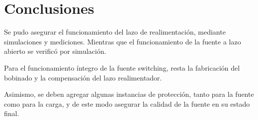 \documentclass[]{article}
\begin{document}
	\section{Conclusiones}
	
	Se pudo asegurar el funcionamiento del lazo de realimentación, mediante simulaciones y mediciones. Mientras que el funcionamiento de la fuente a lazo abierto se verificó por simulación.
	
	Para el funcionamiento íntegro de la fuente switching, resta la fabricación del bobinado y la compensación del lazo realimentador.
	
	Asimismo, se deben agregar algunas instancias de protección, tanto para la fuente como para la carga, y de este modo asegurar la calidad de la fuente en su estado final.
	
	
	
	{\footnotesize
		\printbibliography
	}
	
	
	\newpage
	\appendix



\let\clearpage\relax


\end{document}
